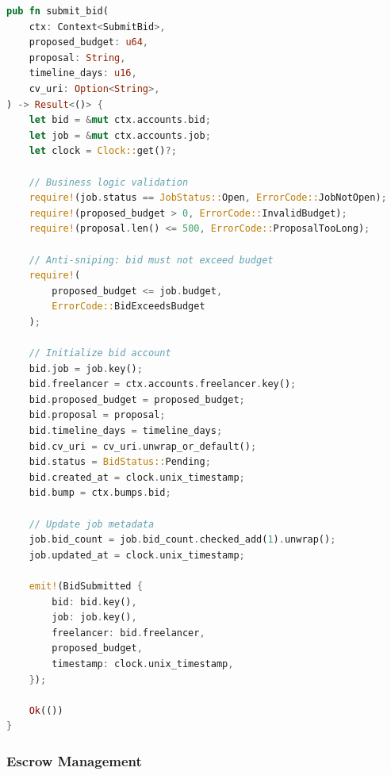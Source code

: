 \documentclass[a4paper,13pt,twoside]{report}
\theoremstyle{definition}
\begin{document}
\begin{lstlisting}[language=Rust, caption=Submit Bid Implementation]
pub fn submit_bid(
    ctx: Context<SubmitBid>,
    proposed_budget: u64,
    proposal: String,
    timeline_days: u16,
    cv_uri: Option<String>,
) -> Result<()> {
    let bid = &mut ctx.accounts.bid;
    let job = &mut ctx.accounts.job;
    let clock = Clock::get()?;

    // Business logic validation
    require!(job.status == JobStatus::Open, ErrorCode::JobNotOpen);
    require!(proposed_budget > 0, ErrorCode::InvalidBudget);
    require!(proposal.len() <= 500, ErrorCode::ProposalTooLong);

    // Anti-sniping: bid must not exceed budget
    require!(
        proposed_budget <= job.budget,
        ErrorCode::BidExceedsBudget
    );

    // Initialize bid account
    bid.job = job.key();
    bid.freelancer = ctx.accounts.freelancer.key();
    bid.proposed_budget = proposed_budget;
    bid.proposal = proposal;
    bid.timeline_days = timeline_days;
    bid.cv_uri = cv_uri.unwrap_or_default();
    bid.status = BidStatus::Pending;
    bid.created_at = clock.unix_timestamp;
    bid.bump = ctx.bumps.bid;

    // Update job metadata
    job.bid_count = job.bid_count.checked_add(1).unwrap();
    job.updated_at = clock.unix_timestamp;

    emit!(BidSubmitted {
        bid: bid.key(),
        job: job.key(),
        freelancer: bid.freelancer,
        proposed_budget,
        timestamp: clock.unix_timestamp,
    });

    Ok(())
}
\end{lstlisting}

\subsubsection{Escrow Management}
\end{document}
